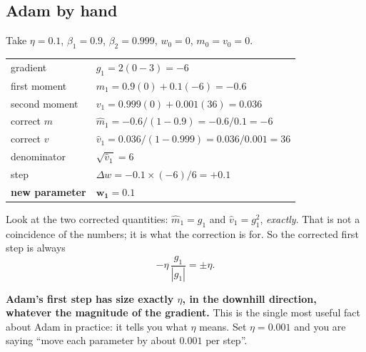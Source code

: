 \documentclass[11pt]{article}
\begin{document}
\subsection{Adam by hand}

\begin{worked}[Adam, step 1, on $f(w)=(w-3)^2$]
Take $\eta = 0.1$, $\beta_1 = 0.9$, $\beta_2 = 0.999$, $w_0 = 0$,
$m_0 = v_0 = 0$.

\begin{center}
\begin{tabular}{@{}ll@{}}
\toprule
gradient       & $g_1 = 2(0-3) = -6$\\[3pt]
first moment   & $m_1 = 0.9(0) + 0.1(-6) = -0.6$\\[3pt]
second moment  & $v_1 = 0.999(0) + 0.001(36) = 0.036$\\[3pt]
correct $m$    & $\hat m_1 = -0.6/(1-0.9) = -0.6/0.1 = -6$\\[3pt]
correct $v$    & $\hat v_1 = 0.036/(1-0.999) = 0.036/0.001 = 36$\\[3pt]
denominator    & $\sqrt{\hat v_1} = 6$\\[3pt]
step           & $\Delta w = -0.1 \times (-6)/6 = +0.1$\\[3pt]
\textbf{new parameter} & $\mathbf{w_1 = 0.1}$\\
\bottomrule
\end{tabular}
\end{center}

Look at the two corrected quantities: $\hat m_1 = g_1$ and
$\hat v_1 = g_1^2$, \emph{exactly}. That is not a coincidence of the numbers; it
is what the correction is for. So the corrected first step is always
\[
  -\eta\,\frac{g_1}{|g_1|} = \pm\eta .
\]

\textbf{Adam's first step has size exactly $\eta$, in the downhill direction,
whatever the magnitude of the gradient.} This is the single most useful fact
about Adam in practice: it tells you what $\eta$ means. Set $\eta = 0.001$ and
you are saying ``move each parameter by about $0.001$ per step''.
\end{worked}
\end{document}

